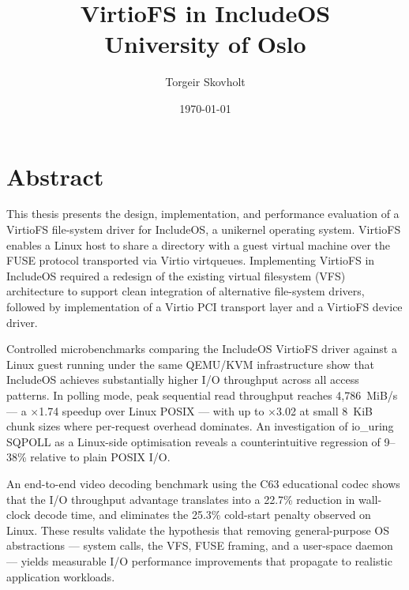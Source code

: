 \documentclass[12pt, a4paper, oneside]{report}
\title{VirtioFS in IncludeOS \\ 
{\Large University of Oslo}}
\author{Torgeir Skovholt}
\date{\today}
\begin{document}
\maketitle

\chapter*{Abstract}

This thesis presents the design, implementation, and performance evaluation of a
VirtioFS file-system driver for IncludeOS, a unikernel operating system.
VirtioFS enables a Linux host to share a directory with a guest virtual machine
over the FUSE protocol transported via Virtio virtqueues.  Implementing VirtioFS
in IncludeOS required a redesign of the existing virtual filesystem (VFS)
architecture to support clean integration of alternative file-system drivers,
followed by implementation of a Virtio PCI transport layer and a VirtioFS device
driver.

Controlled microbenchmarks comparing the IncludeOS VirtioFS driver against a
Linux guest running under the same QEMU/KVM infrastructure show that IncludeOS
achieves substantially higher I/O throughput across all access patterns.  In
polling mode, peak sequential read throughput reaches 4{,}786~MiB/s ---
a \(\times\)1.74 speedup over Linux POSIX --- with up to \(\times\)3.02 at
small 8~KiB chunk sizes where per-request overhead dominates.  An investigation
of io\_uring SQPOLL as a Linux-side optimisation reveals a counterintuitive
regression of 9--38\% relative to plain POSIX I/O.

An end-to-end video decoding benchmark using the C63 educational codec shows that the I/O throughput advantage translates into a 22.7\% reduction in wall-clock decode time, and eliminates the 25.3\% cold-start penalty observed on Linux.  These results validate the hypothesis that removing general-purpose OS abstractions --- system calls, the VFS, FUSE framing, and a user-space daemon --- yields measurable I/O performance improvements that propagate to realistic application workloads.

\tableofcontents


\end{document}
